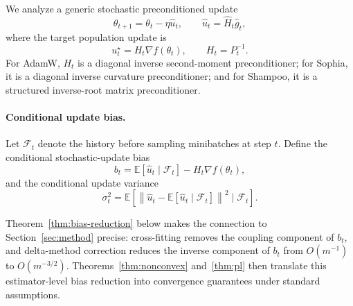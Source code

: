 \documentclass{article}
\newcommand{\E}{\mathbb{E}}
\begin{document}
We analyze a generic stochastic preconditioned update
\begin{equation}
    \theta_{t+1}
    =
    \theta_t-\eta \hat u_t,
    \qquad
    \hat u_t
    =
    \widehat H_t \hat g_t,
\end{equation}
where the target population update is
\begin{equation}
    u_t^\star
    =
    H_t \nabla f(\theta_t),
    \qquad
    H_t=P_t^{-1}.
\end{equation}
For AdamW, $H_t$ is a diagonal inverse second-moment preconditioner; for Sophia, it is a diagonal inverse curvature preconditioner; and for Shampoo, it is a structured inverse-root matrix preconditioner.

\paragraph{Conditional update bias.}
Let $\mathcal F_t$ denote the history before sampling minibatches at step $t$. Define the conditional stochastic-update bias
\begin{equation}
    b_t
    =
    \E[\hat u_t\mid \mathcal F_t]
    -
    H_t\nabla f(\theta_t),
\end{equation}
and the conditional update variance
\begin{equation}
    \sigma_t^2
    =
    \E\!\left[
    \left\|
    \hat u_t-\E[\hat u_t\mid\mathcal F_t]
    \right\|^2
    \mid \mathcal F_t
    \right].
\end{equation}

Theorem~\ref{thm:bias-reduction} below makes the connection to Section~\ref{sec:method} precise: cross-fitting removes the coupling component of $b_t$, and delta-method correction reduces the inverse component of $b_t$ from $O(m^{-1})$ to $O(m^{-3/2})$. Theorems~\ref{thm:nonconvex} and~\ref{thm:pl} then translate this estimator-level bias reduction into convergence guarantees under standard assumptions.
\end{document}
